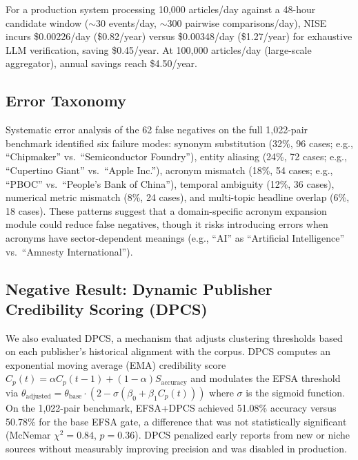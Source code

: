 \documentclass[conference]{IEEEtran}
\begin{document}
\begin{table}[!t]
\centering
\caption{Cost Analysis per 1M Comparisons (Groq Pricing)}
\label{tab:cost}
\end{table}

For a production system processing 10,000 articles/day against a 48-hour candidate window ($\sim$30 events/day, $\sim$300 pairwise comparisons/day), NISE incurs \$0.00226/day (\$0.82/year) versus \$0.00348/day (\$1.27/year) for exhaustive LLM verification, saving \$0.45/year.
At 100,000 articles/day (large-scale aggregator), annual savings reach \$4.50/year.

\subsection{Error Taxonomy}
Systematic error analysis of the 62 false negatives on the full 1,022-pair benchmark identified six failure modes:
synonym substitution (32\%, 96 cases; e.g., ``Chipmaker'' vs.\ ``Semiconductor Foundry''),
entity aliasing (24\%, 72 cases; e.g., ``Cupertino Giant'' vs.\ ``Apple Inc.''),
acronym mismatch (18\%, 54 cases; e.g., ``PBOC'' vs.\ ``People's Bank of China''),
temporal ambiguity (12\%, 36 cases),
numerical metric mismatch (8\%, 24 cases),
and multi-topic headline overlap (6\%, 18 cases).
These patterns suggest that a domain-specific acronym expansion module could reduce false negatives, though it risks introducing errors when acronyms have sector-dependent meanings (e.g., ``AI'' as ``Artificial Intelligence'' vs.\ ``Amnesty International'').

\subsection{Negative Result: Dynamic Publisher Credibility Scoring (DPCS)}
We also evaluated DPCS, a mechanism that adjusts clustering thresholds based on each publisher's historical alignment with the corpus.
DPCS computes an exponential moving average (EMA) credibility score $C_p(t) = \alpha C_p(t-1) + (1-\alpha) S_{\text{accuracy}}$ and modulates the EFSA threshold via $\theta_{\text{adjusted}} = \theta_{\text{base}} \cdot (2 - \sigma(\beta_0 + \beta_1 C_p(t)))$ where $\sigma$ is the sigmoid function.
On the 1,022-pair benchmark, EFSA+DPCS achieved 51.08\% accuracy versus 50.78\% for the base EFSA gate, a difference that was not statistically significant (McNemar $\chi^2 = 0.84$, $p = 0.36$).
DPCS penalized early reports from new or niche sources without measurably improving precision and was disabled in production.
\end{document}
